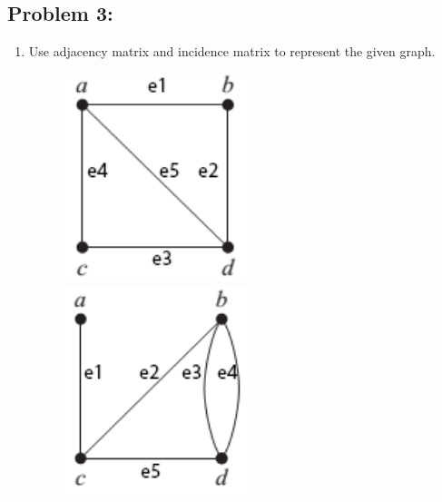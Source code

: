 \documentclass[a4paper]{article}
\begin{document}
	\subsection*{Problem 3:}
	\begin{enumerate}
		\item Use adjacency matrix and incidence matrix to represent the given graph.
		      \begin{figure}[ht]
			      \begin{minipage}{0.3\textwidth}
				      \centering
				      \includegraphics[width=0.5\textwidth]{gprob3_1.png}
			      \end{minipage}
			      \begin{minipage}{0.3\textwidth}
				      \centering
				      \includegraphics[width=0.5\textwidth]{gprob3_2.png}
			      \end{minipage}
			      \begin{minipage}{0.3\textwidth}
				      \centering

\end{minipage}
\end{figure}
\end{enumerate}
\end{document}
